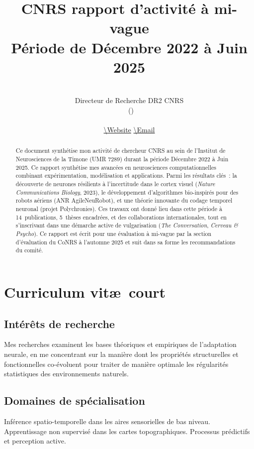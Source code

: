 \documentclass[11pt,french,a4paper,oneside]{article}
\title{\textbf{CNRS rapport d'activité à mi-vague}\\
\large Période de Décembre 2022 à Juin 2025}
\author{\Author\\[.3em]
\small Directeur de Recherche DR2 CNRS\\
\small \Institute\ (\InstituteUMR)\\
\small \Address\\[.2em]
\small \url{\Website} \quad \url{\Email}}
\date{}
\begin{document}
\maketitle

\begin{abstract}
Ce document synthétise mon activité de chercheur CNRS au sein de l'Institut de Neurosciences de la Timone (UMR 7289) durant la période Décembre 2022 à Juin 2025. Ce rapport synthétise mes avancées en neurosciences computationnelles combinant expérimentation, modélisation et applications. Parmi les résultats clés~: la découverte de neurones résilients à l'incertitude dans le cortex visuel (\emph{Nature Communications Biology}, 2023), le développement d'algorithmes bio-inspirés pour des robots aériens (ANR AgileNeuRobot), et une théorie innovante du codage temporel neuronal (projet Polychronies). Ces travaux ont donné lieu dans cette période à 14~publications, 5~thèses encadrées, et des collaborations internationales, tout en s'inscrivant dans une démarche active de vulgarisation (\emph{The Conversation}, \emph{Cerveau \& Psycho}). Ce rapport est écrit pour une évaluation à mi-vague par la section d'évaluation du CoNRS à l'automne 2025 et suit dans sa forme les recommandations du comité.
\end{abstract}

\tableofcontents
\newpage

\section{Curriculum vit\ae\ court}

\subsection*{Intérêts de recherche}

Mes recherches examinent les bases théoriques et empiriques de l'adaptation neurale, en me concentrant sur la manière dont les propriétés structurelles et fonctionnelles co-évoluent pour traiter de manière optimale les régularités statistiques des environnements naturels.

\subsection*{Domaines de spécialisation}

Inférence spatio-temporelle dans les aires sensorielles de bas niveau. Apprentissage non supervisé dans les cartes topographiques. Processus prédictifs et perception active.
\end{document}
